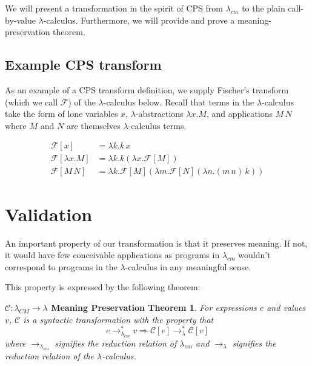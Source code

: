 \documentclass[ms]{byuprop}
\newcounter{definition}
\newcounter{example}
\newtheorem*{cmtheorem}{$\mathcal{C}:\lambda_{CM}\rightarrow\lambda$ Meaning Preservation Theorem}
\begin{document}
We will present a transformation in the spirit of CPS from $\lambda_{cm}$ to 
the plain call-by-value $\lambda$-calculus. Furthermore, we will provide and 
prove a meaning-preservation theorem.

\subsection{Example CPS transform}

As an example of a CPS transform definition, we supply Fischer's transform 
(which we call $\mathcal{F}$) of the $\lambda$-calculus 
\cite{fischer1972lambda} below. Recall that terms in 
the $\lambda$-calculus take the form of lone variables $x$, 
$\lambda$-abstractions $\lambda x.M$, and applications 
$M\,N$ where $M$ and $N$ are themselves $\lambda$-calculus terms.

\begin{align*}
\mathcal{F}[x]           &= \lambda k.k\,x\\
\mathcal{F}[\lambda x.M] &= \lambda k.k(\lambda x.\mathcal{F}[M])\\
\mathcal{F}[M\,N]       &= \lambda k.\mathcal{F}[M](\lambda m.\mathcal{F}[N](\lambda n.(m\,n)\,k))
\end{align*}




\section{Validation}

An important property of our transformation is that it preserves meaning. If not, 
it would have few conceivable applications as programs in $\lambda_{cm}$ wouldn't 
correspond to programs in the $\lambda$-calculus in any meaningful sense.

This property is expressed by the following theorem:

\begin{cmtheorem}

For expressions $e$ and values $v$, $\mathcal{C}$ is a syntactic transformation with the 
property that
\[
e\rightarrow^{*}_{\lambda_{cm}}v\Rightarrow \mathcal{C}[e]\rightarrow^{*}_{\lambda}\mathcal{C}[v]
\]
where $\rightarrow_{\lambda_{cm}}$ signifies the reduction relation of $\lambda_{cm}$ 
and $\rightarrow_{\lambda}$ signifies the reduction relation of the $\lambda$-calculus.

\end{cmtheorem}
\end{document}
